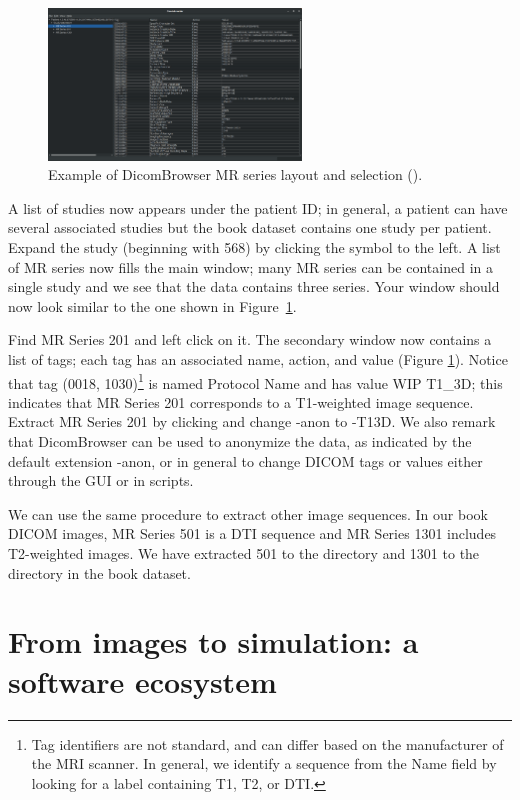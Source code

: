 \begin{figure}[h]
  \centering
  \includegraphics[width=0.6\textwidth]{./chapters/chp2/FIG/dicombrowser-c}
  \caption{Example of DicomBrowser MR series layout and selection (\emp{\erniedicom}).} 
  \label{fig:chp2:dicombrwsr-scr}
\end{figure}

A list of studies now appears under the patient ID; in general, a
patient can have several associated studies but the book dataset
contains one study per patient. Expand the study (beginning with 568)
by clicking the symbol to the left. A list of MR series now fills the
main window; many MR series can be contained in a single study and we
see that the \emp{\erniedicom} data contains three series.  Your
window should now look similar to the one shown in
Figure~\ref{fig:chp2:dicombrwsr-scr}.

Find MR Series 201 and left click on it. The secondary window now
contains a list of tags; each tag has an associated name, action, and
value (Figure \ref{fig:chp2:dicombrwsr-scr}). Notice that tag (0018,
1030)\footnote{Tag identifiers are not standard, and can differ based
  on the manufacturer of the MRI scanner.  In general, we identify a
  sequence from the Name field by looking for a label containing T1,
  T2, or DTI.} is named Protocol Name and has value WIP T1\_3D; this
indicates that MR Series 201 corresponds to a T1-weighted image
sequence. Extract MR Series 201 by clicking
 and change -anon to -T13D. We also
remark that DicomBrowser can be used to anonymize the data, as
indicated by the default extension {-anon}, or in general to change
DICOM tags or values either through the GUI or in scripts. 

We can use the same procedure to extract other image sequences. In our
book DICOM images, MR Series 501 is a DTI sequence and MR Series 1301
includes T2-weighted images. We have extracted 501 to the directory
 and 1301 to the directory  in the book dataset.


\section{From images to simulation: a software ecosystem}

